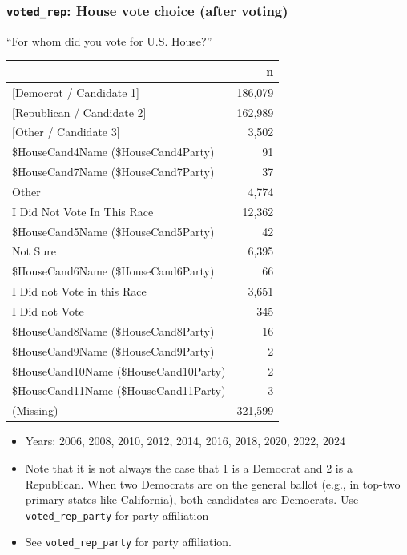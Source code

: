 \documentclass[10pt,article,oneside]{memoir}
\begin{document}
\subsubsection{\texorpdfstring{\texttt{voted\_rep}: House vote choice
(after
voting)}{voted\_rep: House vote choice (after voting)}}\label{voted_rep-house-vote-choice-after-voting}

``For whom did you vote for U.S. House?''

\begin{table}[H]
\centering
\begin{tabular}[t]{lr}
\toprule
 & n\\
\midrule
{}{[Democrat / Candidate 1]} & 186,079\\
{}{[Republican / Candidate 2]} & 162,989\\
{}{[Other / Candidate 3]} & 3,502\\
\$HouseCand4Name (\$HouseCand4Party) & 91\\
\$HouseCand7Name (\$HouseCand7Party) & 37\\
Other & 4,774\\
I Did Not Vote In This Race & 12,362\\
\$HouseCand5Name (\$HouseCand5Party) & 42\\
Not Sure & 6,395\\
\$HouseCand6Name (\$HouseCand6Party) & 66\\
I Did not Vote in this Race & 3,651\\
I Did not Vote & 345\\
\$HouseCand8Name (\$HouseCand8Party) & 16\\
\$HouseCand9Name (\$HouseCand9Party) & 2\\
\$HouseCand10Name (\$HouseCand10Party) & 2\\
\$HouseCand11Name (\$HouseCand11Party) & 3\\
(Missing) & 321,599\\
\bottomrule
\end{tabular}
\end{table}

\begin{itemize}
\tightlist
\item
  Years: 2006, 2008, 2010, 2012, 2014, 2016, 2018, 2020, 2022, 2024
\item
  Note that it is not always the case that 1 is a Democrat and 2 is a
  Republican. When two Democrats are on the general ballot (e.g., in
  top-two primary states like California), both candidates are
  Democrats. Use \texttt{voted\_rep\_party} for party affiliation
\item
  See \texttt{voted\_rep\_party} for party affiliation.
\end{itemize}
\end{document}
